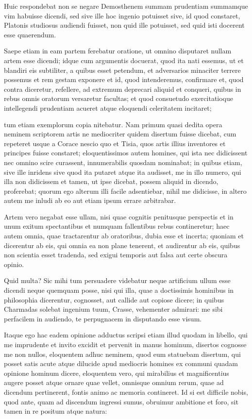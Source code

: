  Huic respondebat non se negare Demosthenem summam prudentiam summamque vim habuisse dicendi, sed sive ille hoc ingenio potuisset sive, id quod constaret, Platonis studiosus audiendi fuisset, non quid ille potuisset, sed quid isti docerent esse quaerendum.

 Saepe etiam in eam partem ferebatur oratione, ut omnino disputaret nullam artem esse dicendi; idque cum argumentis docuerat, quod ita nati essemus, ut et blandiri eis subtiliter, a quibus esset petendum, et adversarios minaciter terrere possemus et rem gestam exponere et id, quod intenderemus, confirmare et, quod contra diceretur, refellere, ad extremum deprecari aliquid et conqueri, quibus in rebus omnis oratorum versaretur facultas; et quod consuetudo exercitatioque intellegendi prudentiam acueret atque eloquendi celeritatem incitaret;

 tum etiam exemplorum copia nitebatur. Nam primum quasi dedita opera neminem scriptorem artis ne mediocriter quidem disertum fuisse dicebat, cum repeteret usque a Corace nescio quo et Tisia, quos artis illius inventores et principes fuisse constaret; eloquentissimos autem homines, qui ista nec didicissent nec omnino scire curassent, innumerabilis quosdam nominabat; in quibus etiam, sive ille inridens sive quod ita putaret atque ita audisset, me in illo numero, qui illa non didicissem et tamen, ut ipse dicebat, possem aliquid in dicendo, proferebat; quorum ego alterum illi facile adsentiebar, nihil me didicisse, in altero autem me inludi ab eo aut etiam ipsum errare arbitrabar.

 Artem vero negabat esse ullam, nisi quae cognitis penitusque perspectis et in unum exitum spectantibus et numquam fallentibus rebus contineretur; haec autem omnia, quae tractarentur ab oratoribus, dubia esse et incerta; quoniam et dicerentur ab eis, qui omnia ea non plane tenerent, et audirentur ab eis, quibus non scientia esset tradenda, sed exigui temporis aut falsa aut certe obscura opinio.

 Quid multa? Sic mihi tum persuadere videbatur neque artificium ullum esse dicendi neque quemquam posse, nisi qui illa, quae a doctissimis hominibus in philosophia dicerentur, cognosset, aut callide aut copiose dicere; in quibus Charmadas solebat ingenium tuum, Crasse, vehementer admirari: me sibi perfacilem in audiendo, te perpugnacem in disputando esse visum.

 Itaque ego hac eadem opinione adductus scripsi etiam illud quodam in libello, qui me imprudente et invito excidit et pervenit in manus hominum, disertos cognosse me non nullos, eloquentem adhuc neminem, quod eum statuebam disertum, qui posset satis acute atque dilucide apud mediocris homines ex communi quadam opinione hominum dicere, eloquentem vero, qui mirabilius et magnificentius augere posset atque ornare quae vellet, omnisque omnium rerum, quae ad dicendum pertinerent, fontis animo ac memoria contineret. Id si est difficile nobis, quod ante, quam ad discendum ingressi sumus, obruimur ambitione et foro, sit tamen in re positum atque natura:

